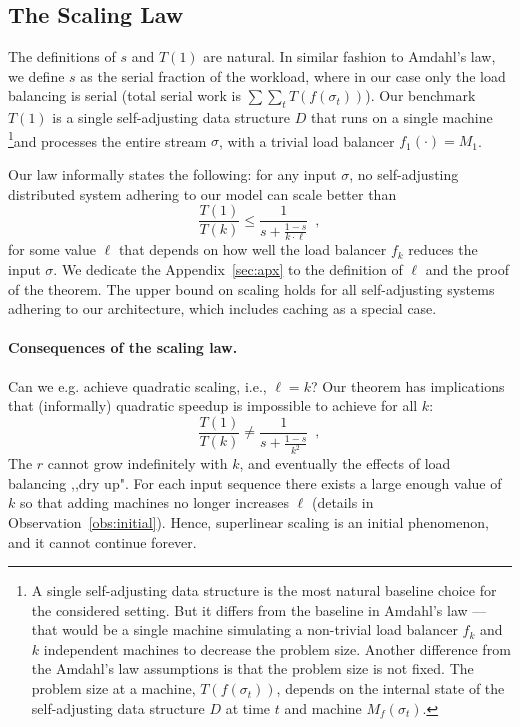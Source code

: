

\subsection{The Scaling Law}

The definitions of $s$ and $T(1)$ are natural.
In similar fashion to Amdahl's law, we define $s$ as the serial fraction of the workload, where in our case only the load balancing is serial (total serial work is $\sum \sum_t T(f(\sigma_t))$).
Our benchmark $T(1)$ is a single self-adjusting data structure $D$ that runs on a single machine \footnote{A single self-adjusting data structure is the most natural baseline choice for the considered setting. But it differs from the baseline in Amdahl's law --- that would be a single machine simulating a non-trivial load balancer $f_k$ and $k$ independent machines to decrease the problem size. Another difference from the Amdahl's law assumptions is that the problem size is not fixed. The problem size at a machine, $T(f(\sigma_t))$, depends on the internal state of the self-adjusting data structure $D$ at time $t$ and machine $M_f(\sigma_t)$.}and processes the entire stream $\sigma$, with a trivial load balancer $f_1(\cdot) = M_1$.


Our law informally states the following: for any input $\sigma$, no self-adjusting distributed system adhering to our model can scale better than
\begin{equation*}\label{eq:mtf-perf}
  \frac{T(1)}{T(k)} \le \frac1{s + \frac{1-s}{k \cdot \ell}} \enspace ,
\end{equation*}
for some value $\ell$ that depends on how well the load balancer $f_k$ reduces the input $\sigma$.
We dedicate the Appendix~\ref{sec:apx} to the definition of $\ell$ and the proof of the theorem.
The upper bound on scaling holds for all self-adjusting systems adhering to our architecture, which includes caching as a special case.




\paragraph{Consequences of the scaling law.}
Can we e.g. achieve quadratic scaling, i.e., $\ell = k$? 
Our theorem has implications that (informally) quadratic speedup is impossible to achieve for all $k$:
\begin{equation*}\label{eq:mtf-perf}
  \frac{T(1)}{T(k)} \neq \frac1{s + \frac{1-s}{k^2}} \enspace ,
\end{equation*}
The $r$ cannot grow indefinitely with $k$, and eventually the effects of load balancing ,,dry up". For each input sequence there exists a large enough value of $k$ so that adding machines no longer increases $\ell$ (details in Observation~\ref{obs:initial}). Hence, superlinear scaling is an initial phenomenon, and it cannot continue forever.





